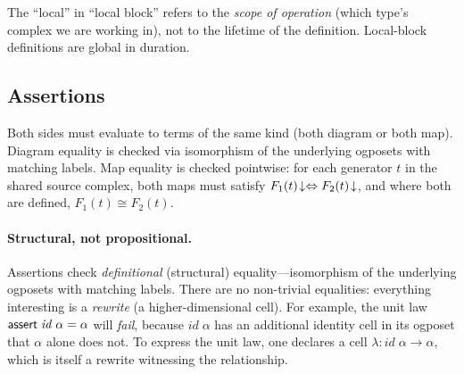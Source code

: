 \documentclass[acmsmall,screen,nonacm]{acmart}
\begin{document}
The ``local'' in ``local block'' refers to the \emph{scope of operation}
(which type's complex we are working in), not to the lifetime of the
definition. Local-block definitions are global in duration.

\subsection{Assertions}
\label{sec:local:assert}


Both sides must evaluate to terms of the same kind (both diagram or both
map). Diagram equality is checked via isomorphism of the underlying
ogposets with matching labels. Map equality is checked pointwise: for
each generator $t$ in the shared source complex, both maps must satisfy
$F_1(t)\!\downarrow \Leftrightarrow F_2(t)\!\downarrow$, and where both are defined, $F_1(t) \cong F_2(t)$.

\paragraph{Structural, not propositional.}
Assertions check \emph{definitional} (structural) equality---isomorphism
of the underlying ogposets with matching labels. There are no non-trivial
equalities: everything interesting is a \emph{rewrite} (a
higher-dimensional cell). For example, the unit law
$\mathsf{assert}\;\mathit{id}\;{}\alpha = \alpha$ will \emph{fail}, because
$\mathit{id}\;{}\alpha$ has an additional identity cell in its ogposet
that $\alpha$ alone does not. To express the unit law, one declares a
cell $\lambda : \mathit{id}\;{}\alpha \to \alpha$, which is itself a
rewrite witnessing the relationship.
\end{document}
